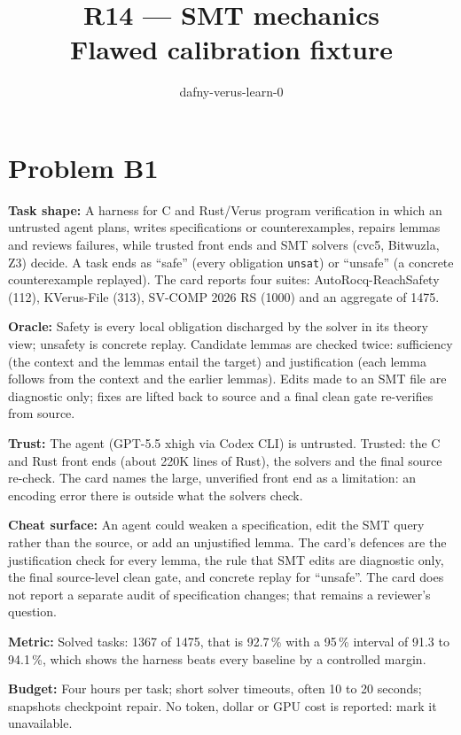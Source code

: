 \documentclass[11pt]{article}
\title{R14 --- SMT mechanics \\ \large Flawed calibration fixture}
\author{dafny-verus-learn-0}
\date{}
\begin{document}
\maketitle
\section*{Problem B1}\label{ans:B1}
\begin{answer}
\textbf{Task shape:} A harness for C and Rust/Verus program verification in which an untrusted agent plans, writes specifications or counterexamples, repairs lemmas and reviews failures, while trusted front ends and SMT solvers (cvc5, Bitwuzla, Z3) decide. A task ends as ``safe'' (every obligation \texttt{unsat}) or ``unsafe'' (a concrete counterexample replayed). The card reports four suites: AutoRocq-ReachSafety (112), KVerus-File (313), SV-COMP 2026 RS (1000) and an aggregate of 1475.

\textbf{Oracle:} Safety is every local obligation discharged by the solver in its theory view; unsafety is concrete replay. Candidate lemmas are checked twice: sufficiency (the context and the lemmas entail the target) and justification (each lemma follows from the context and the earlier lemmas). Edits made to an SMT file are diagnostic only; fixes are lifted back to source and a final clean gate re-verifies from source.

\textbf{Trust:} The agent (GPT-5.5 xhigh via Codex CLI) is untrusted. Trusted: the C and Rust front ends (about 220K lines of Rust), the solvers and the final source re-check. The card names the large, unverified front end as a limitation: an encoding error there is outside what the solvers check.

\textbf{Cheat surface:} An agent could weaken a specification, edit the SMT query rather than the source, or add an unjustified lemma. The card's defences are the justification check for every lemma, the rule that SMT edits are diagnostic only, the final source-level clean gate, and concrete replay for ``unsafe''. The card does not report a separate audit of specification changes; that remains a reviewer's question.

\textbf{Metric:} Solved tasks: 1367 of 1475, that is 92.7\,\% with a 95\,\% interval of 91.3 to 94.1\,\%, which shows the harness beats every baseline by a controlled margin.

\textbf{Budget:} Four hours per task; short solver timeouts, often 10 to 20 seconds; snapshots checkpoint repair. No token, dollar or GPU cost is reported: mark it unavailable.


\end{answer}
\end{document}
